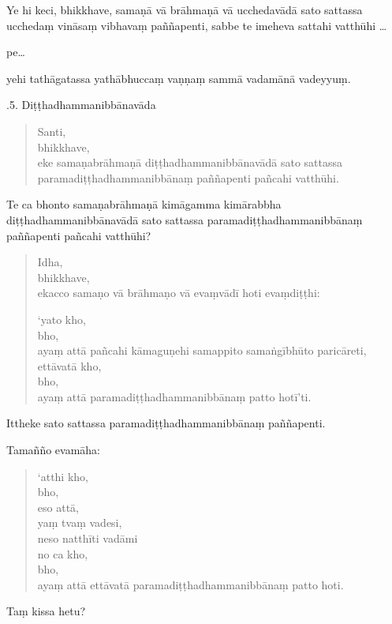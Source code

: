 \documentclass[11pt,twoside,openright]{book}
\begin{document}
\pstart
Ye hi keci, bhikkhave, samaṇā vā brāhmaṇā vā ucchedavādā sato sattassa ucchedaṃ vināsaṃ vibhavaṃ paññapenti, sabbe te imeheva sattahi vatthūhi …
\pend

\pstart
pe…
\pend

\pstart
yehi tathāgatassa yathābhuccaṃ vaṇṇaṃ sammā vadamānā vadeyyuṃ.
\pend

.5. Diṭṭhadhammanibbānavāda
\pend

\begin{verse}
Santi,\\
\vin  bhikkhave,\\
\vin  eke samaṇabrāhmaṇā diṭṭhadhammanibbānavādā sato sattassa paramadiṭṭhadhammanibbānaṃ paññapenti pañcahi vatthūhi.

\end{verse}
\pstart
Te ca bhonto samaṇabrāhmaṇā kimāgamma kimārabbha diṭṭhadhammanibbānavādā sato sattassa paramadiṭṭhadhammanibbānaṃ paññapenti pañcahi vatthūhi?
\pend

\begin{verse}
Idha,\\
\vin  bhikkhave,\\
\vin  ekacco samaṇo vā brāhmaṇo vā evaṃvādī hoti evaṃdiṭṭhi:

‘yato kho,\\
\vin  bho,\\
\vin  ayaṃ attā pañcahi kāmaguṇehi samappito samaṅgībhūto paricāreti,\\
\vin  ettāvatā kho,\\
\vin  bho,\\
\vin  ayaṃ attā paramadiṭṭhadhammanibbānaṃ patto hotī’ti.

\end{verse}
\pstart
Ittheke sato sattassa paramadiṭṭhadhammanibbānaṃ paññapenti.
\pend

\pstart
Tamañño evamāha:
\pend

\begin{verse}
‘atthi kho,\\
\vin  bho,\\
\vin  eso attā,\\
\vin  yaṃ tvaṃ vadesi,\\
\vin  neso natthīti vadāmi\\


no ca kho,\\
\vin  bho,\\
\vin  ayaṃ attā ettāvatā paramadiṭṭhadhammanibbānaṃ patto hoti.

\end{verse}
\pstart
Taṃ kissa hetu?
\pend
\end{document}
